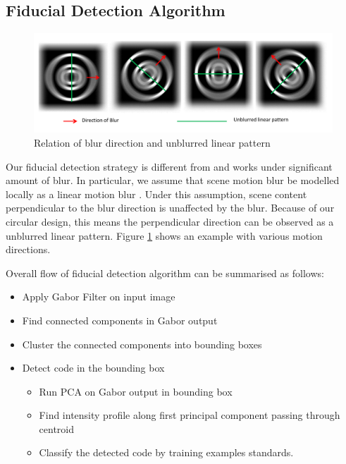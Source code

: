 \documentclass[runningheads]{llncs}
\begin{document}
\subsection{Fiducial Detection Algorithm}

\begin{figure}
\centering
\includegraphics[width=\linewidth]{blur_direction.pdf}
\caption{Relation of blur direction and unblurred linear pattern}
\label{fig:blur_direction}
\end{figure}

Our fiducial detection strategy is different from \cite{NaimarkF02,Pitag13} and works
under significant amount of blur.   In particular, we assume that scene motion
blur be modelled locally as a linear motion blur \cite{Moshe:2003,Moshe:2004}. 
Under this assumption, scene content perpendicular to the blur direction is 
unaffected by the blur.  Because of our circular design, this means the
perpendicular direction can be observed as a unblurred linear pattern.  Figure
\ref{fig:blur_direction} shows an example with various motion directions.

Overall flow of fiducial detection algorithm can be summarised as follows:

\begin{itemize}
  \item Apply Gabor Filter on input image
  \item Find connected components in Gabor output
  \item Cluster the connected components into bounding boxes
  \item Detect code in the bounding box
  \begin{itemize}
    \item Run PCA on Gabor output in bounding box
    \item Find intensity profile along first principal component passing through
    centroid
    \item Classify the detected code by training examples
    standards.
  \end{itemize}
\end{itemize}
\end{document}
